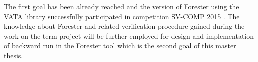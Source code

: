 The first goal has been already reached and the version of Forester using the VATA library successfully participated in competition SV-COMP 2015 \cite{www:svcomp}.
The knowledge about Forester and related verification procedure gained during the work on the term project will be further employed for design
and implementation of backward run in the Forester tool which is the second goal of this master thesis.

